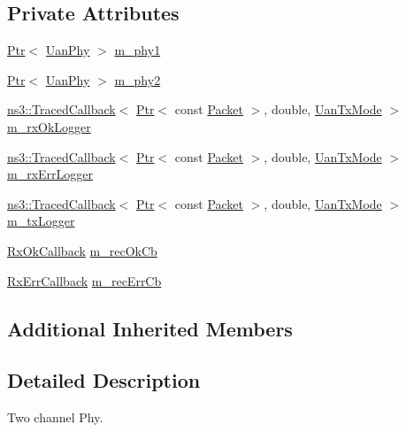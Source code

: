 \subsection*{Private Attributes}
\begin{DoxyCompactItemize}
\item 
\hyperlink{classns3_1_1Ptr}{Ptr}$<$ \hyperlink{classns3_1_1UanPhy}{Uan\+Phy} $>$ \hyperlink{classns3_1_1UanPhyDual_a044538c53fd54f356f33acf4957ab1e3}{m\+\_\+phy1}
\item 
\hyperlink{classns3_1_1Ptr}{Ptr}$<$ \hyperlink{classns3_1_1UanPhy}{Uan\+Phy} $>$ \hyperlink{classns3_1_1UanPhyDual_a36497239aebc68ce6e20f166ab0fefc7}{m\+\_\+phy2}
\item 
\hyperlink{classns3_1_1TracedCallback}{ns3\+::\+Traced\+Callback}$<$ \hyperlink{classns3_1_1Ptr}{Ptr}$<$ const \hyperlink{classns3_1_1Packet}{Packet} $>$, double, \hyperlink{classns3_1_1UanTxMode}{Uan\+Tx\+Mode} $>$ \hyperlink{classns3_1_1UanPhyDual_adfdf3cb0199f848fdc9ad75474d0ab0e}{m\+\_\+rx\+Ok\+Logger}
\item 
\hyperlink{classns3_1_1TracedCallback}{ns3\+::\+Traced\+Callback}$<$ \hyperlink{classns3_1_1Ptr}{Ptr}$<$ const \hyperlink{classns3_1_1Packet}{Packet} $>$, double, \hyperlink{classns3_1_1UanTxMode}{Uan\+Tx\+Mode} $>$ \hyperlink{classns3_1_1UanPhyDual_a2933108d3c6337b137ff15ad4fc201c6}{m\+\_\+rx\+Err\+Logger}
\item 
\hyperlink{classns3_1_1TracedCallback}{ns3\+::\+Traced\+Callback}$<$ \hyperlink{classns3_1_1Ptr}{Ptr}$<$ const \hyperlink{classns3_1_1Packet}{Packet} $>$, double, \hyperlink{classns3_1_1UanTxMode}{Uan\+Tx\+Mode} $>$ \hyperlink{classns3_1_1UanPhyDual_a455f735d55ccdaaa2b5d593b22ea33ec}{m\+\_\+tx\+Logger}
\item 
\hyperlink{classns3_1_1UanPhy_a0b4ce695657b1c0b7f52ae474f3d98f9}{Rx\+Ok\+Callback} \hyperlink{classns3_1_1UanPhyDual_a02108c001d3caa3b354350221b316726}{m\+\_\+rec\+Ok\+Cb}
\item 
\hyperlink{classns3_1_1UanPhy_ae0da6892a65ba998fb1d649f31b118c4}{Rx\+Err\+Callback} \hyperlink{classns3_1_1UanPhyDual_ac793e3b99f1842b5ea35554380d23f38}{m\+\_\+rec\+Err\+Cb}
\end{DoxyCompactItemize}
\subsection*{Additional Inherited Members}


\subsection{Detailed Description}
Two channel Phy.

